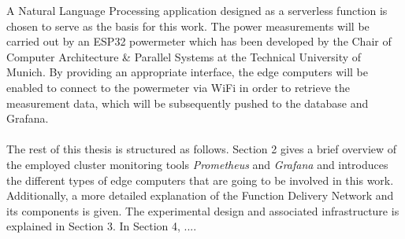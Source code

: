A Natural Language Processing application designed as a serverless function is chosen to serve as the basis for this work. The power measurements will be carried out by an ESP32 powermeter which has been developed by the Chair of Computer Architecture \& Parallel Systems at the Technical University of Munich. By providing an appropriate interface, the edge computers will be enabled to connect to the powermeter via WiFi in order to retrieve the measurement data, which will be subsequently pushed to the database and Grafana.
\\
\\
The rest of this thesis is structured as follows. Section 2 gives a brief overview of the employed cluster monitoring tools \textit{Prometheus} and \textit{Grafana} and introduces the different types of edge computers that are going to be involved in this work. Additionally, a more detailed explanation of the Function Delivery Network and its components is given. The experimental design and associated infrastructure is explained in Section 3. In Section 4, ....